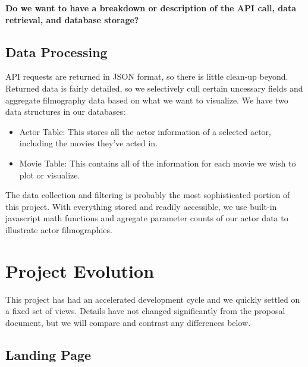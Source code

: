 \documentclass[12pt]{article}
\begin{document}
	\begin{center}
	\color{blue}
	\textbf{Do we want to have a breakdown or description of the API call, data retrieval, and database storage? }
	\end{center}
	
\subsection{Data Processing}
	API requests are returned in JSON format, so there is little clean-up beyond. Returned data is fairly detailed, so we selectively cull certain uncessary fields and aggregate filmography data based on what we want to visualize. We have two data structures in our databases:
	
	\begin{itemize}
		\item Actor Table: This stores all the actor information of a selected actor, including the movies they've acted in.
		\item Movie Table: This contains all of the information for each movie we wish to plot or visualize.
	\end{itemize}
	
	The data collection and filtering is probably the most sophisticated portion of this project. With everything stored and readily accessible, we use built-in javascript math functions and agregate parameter counts of our actor data to illustrate actor filmographies.

\newpage 

\section{Project Evolution}

This project has had an accelerated development cycle and we quickly settled on a fixed set of views.  Details have not changed significantly from the proposal document, but we will compare and contrast any differences below.

\subsection{Landing Page}
\end{document}
